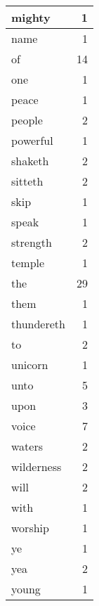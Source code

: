\begin{center}
\begin{longtable}{l|r}
mighty & 1 \\ \hline
name & 1 \\ \hline
of & 14 \\ \hline
one & 1 \\ \hline
peace & 1 \\ \hline
people & 2 \\ \hline
powerful & 1 \\ \hline
shaketh & 2 \\ \hline
sitteth & 2 \\ \hline
skip & 1 \\ \hline
speak & 1 \\ \hline
strength & 2 \\ \hline
temple & 1 \\ \hline
the & 29 \\ \hline
them & 1 \\ \hline
thundereth & 1 \\ \hline
to & 2 \\ \hline
unicorn & 1 \\ \hline
unto & 5 \\ \hline
upon & 3 \\ \hline
voice & 7 \\ \hline
waters & 2 \\ \hline
wilderness & 2 \\ \hline
will & 2 \\ \hline
with & 1 \\ \hline
worship & 1 \\ \hline
ye & 1 \\ \hline
yea & 2 \\ \hline
young & 1 \\ \hline
\end{longtable}
\end{center}



\normalsize



